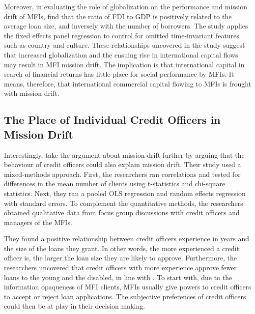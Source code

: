 \documentclass[a4paper, nobind]{templates/ociamthesis}
\begin{document}
\noindent Moreover, in evaluating the role of globalization on the performance and mission drift of MFIs, \textcite{forkusam2014does} find that the ratio of FDI to GDP is positively related to the average loan size, and inversely with the number of borrowers. The study applies the fixed effects panel regression to control for omitted time-invariant features such as country and culture. These relationships uncovered in the study suggest that increased globalization and the ensuing rise in international capital flows may result in MFI mission drift. The implication is that international capital in search of financial returns has little place for social performance by MFIs. It means, therefore, that international commercial capital flowing to MFIs is frought with mission drift.

\hypertarget{the-place-of-individual-credit-officers-in-mission-drift}{%
\subsection{The Place of Individual Credit Officers in Mission Drift}\label{the-place-of-individual-credit-officers-in-mission-drift}}

\noindent Interestingly, \textcite{beisland2019commercialization} take the argument about mission drift further by arguing that the behaviour of credit officers could also explain mission drift. Their study used a mixed-methods approach. First, the researchers ran correlations and tested for differences in the mean number of clients using t-statistics and chi-square statistics. Next, they ran a pooled OLS regression and random effects regression with standard errors. To complement the quantitative methods, the researchers obtained qualitative data from focus group discussions with credit officers and managers of the MFIs.

They found a positive relationship between credit officers experience in years and the size of the loans they grant. In other words, the more experienced a credit officer is, the larger the loan size they are likely to approve. Furthermore, the researchers uncovered that credit officers with more experience approve fewer loans to the young and the disabled, in line with \autocite{labie2015discrimination}. To start with, due to the information opaqueness of MFI clients, MFIs usually give powers to credit officers to accept or reject loan applications. The subjective preferences of credit officers could then be at play in their decision making.
\end{document}
